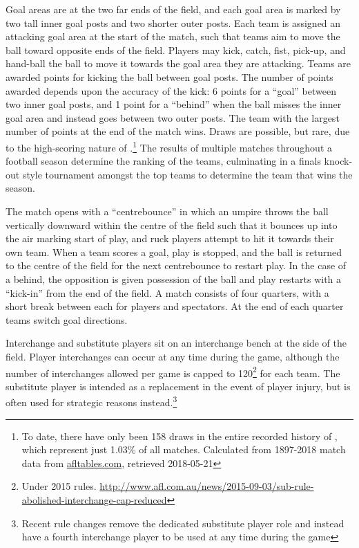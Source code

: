 Goal areas are at the two far ends of the field, and each goal area is marked by two tall inner goal posts and two shorter outer posts. Each team is assigned an attacking goal area at the start of the match, such that teams aim to move the ball toward opposite ends of the field. Players may kick, catch, fist, pick-up, and hand-ball the ball to move it towards the goal area they are attacking. Teams are awarded points for kicking the ball between goal posts. The number of points awarded depends upon the accuracy of the kick: 6 points
for a ``goal'' between two inner goal posts, and 1 point for a ``\gls{behind}'' when the ball misses the inner goal area and instead goes between two outer posts. The team with the largest number of points at the end of the match wins. Draws are possible, but rare, due to the high-scoring nature of \arf{}.\footnote{To date, there have only been 158 draws in the entire recorded history of \afl{}, which represent just 1.03\% of all matches. Calculated from 1897-2018 match data from \url{afltables.com}, retrieved 2018-05-21} The results of multiple matches throughout a football season determine the ranking of the teams, culminating in a finals knock-out style tournament amongst the top teams to determine the team that wins the season.

The match opens with a ``\gls{centrebounce}'' in which an umpire throws the ball vertically downward within the centre of the field such that it bounces up into the air marking start of play, and ruck players attempt to hit it towards their own team. When a team scores a goal, play is stopped, and the ball is returned to the centre of the field for the next \gls{centrebounce} to restart play. In the case of a \gls{behind}, the opposition is given possession of the ball and play restarts with a ``\gls{kick-in}'' from the end of the field. A match consists of four \glspl{quarter}, with a short break between each for players and spectators. At the end of each \gls{quarter} teams switch goal directions.

Interchange and substitute players sit on an interchange bench at the side of the field. Player interchanges can occur at any time during the game, although the number of interchanges allowed per game is capped to
120\footnote{Under 2015 rules. \url{http://www.afl.com.au/news/2015-09-03/sub-rule-abolished-interchange-cap-reduced}} for each team. The substitute player is intended as a replacement in the event of player injury, but is often used for strategic reasons instead.\footnote{Recent rule changes remove the dedicated substitute player role and instead have a fourth interchange player to be used at any time during the game}

